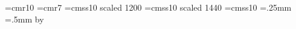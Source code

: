 %
%
% 
%
%
%
\font\bitfont=cmr10 \bitfont=3mm
\font\codefont=cmr7
\font\namefont=cmss10 scaled 1200
\font\titlefont=cmss10 scaled 1440
\font\commentfont=cmss10
\newdimen\thinlinewidth \thinlinewidth=.25mm
\newdimen\fatlinewidth \fatlinewidth=.5mm
\newdimen\rowheight \rowheight=0.95cm
\newdimen\colwidth  \colwidth=1.6cm
\newdimen\Colwidth {}\colwidth
  \advance\Colwidth by \thinlinewidth
\newdimen\topwhite \topwhite=2pt
\newdimen\botwhite \botwhite=3pt
\newdimen\leftwhite \leftwhite=2pt
\newdimen\rightwhite \rightwhite=2pt
\newcount\rowcount {} %
\newcount\colcount {}
\newcount\thenumber
\def\\{$\backslash$}
\def\thinline{\vrule width \thinlinewidth}
\def\fatline{\vrule width \fatlinewidth}
\def\calcnumber{{\multiply\colcount by 16
                 \advance\colcount by \rowcount
                 \global\thenumber=\colcount}}
\def\deccode{\number\thenumber}
\def\octcode{{\ifnum\thenumber>63
                            \advance\thenumber by -64
                            \count0=\thenumber \divide\count0 by 8
                            1\number\count0
              \else         \count0=\thenumber \divide\count0 by 8
                            \ifnum\count0>0 \number\count0 \fi\fi
              \multiply\count0 by 8
              \advance\thenumber by -\count0
              \number\thenumber}}
